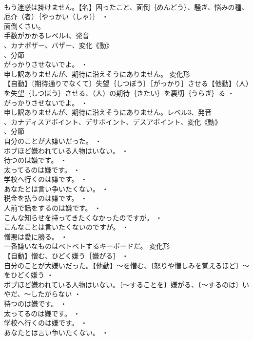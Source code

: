 \documentclass[8pt]{extreport}
\begin{document}
\begin{CJK}{UTF8}{min}
\\	もう迷惑は掛けません。【名】困ったこと、面倒｛めんどう｝、騒ぎ、悩みの種、厄介（者）｛やっかい（しゃ）｝ ・
\\	面倒くさい。
\\	手数がかかるレベル4、発音
\\	、カナボザー、バザー、変化《動》
\\	、分節
\\	がっかりさせないでよ。 ・
\\	申し訳ありませんが、期待に沿えそうにありません。	変化形 
\\	【自動】〔期待通りでなくて〕失望｛しつぼう｝［がっかり］させる【他動】（人）を失望｛しつぼう｝させる、（人）の期待｛きたい｝を裏切｛うらぎ｝る ・
\\	がっかりさせないでよ。 ・
\\	申し訳ありませんが、期待に沿えそうにありません。レベル3、発音
\\	、カナディスアポイント、デサポイント、デスアポイント、変化《動》
\\	、分節
\\	自分のことが大嫌いだった。 ・
\\	ボブほど嫌われている人物はいない。 ・
\\	待つのは嫌です。 ・
\\	太ってるのは嫌です。 ・
\\	学校へ行くのは嫌です。 ・
\\	あなたとは言い争いたくない。 ・
\\	税金を払うのは嫌です。 ・
\\	人前で話をするのは嫌です。 ・
\\	こんな知らせを持ってきたくなかったのですが。 ・
\\	こんなことは言いたくないのですが。 ・
\\	憎悪は愛に勝る。 ・
\\	一番嫌いなものはベトベトするキーボードだ。	変化形 
\\	【自動】憎む、ひどく嫌う［嫌がる］ ・
\\	自分のことが大嫌いだった。【他動】～を憎む、〔怒りや憎しみを覚えるほど〕～をひどく嫌う ・
\\	ボブほど嫌われている人物はいない。〔～することを〕嫌がる、〔～するのは〕いやだ、～したがらない ・
\\	待つのは嫌です。 ・
\\	太ってるのは嫌です。 ・
\\	学校へ行くのは嫌です。 ・
\\	あなたとは言い争いたくない。 ・

\end{CJK}
\end{document}
